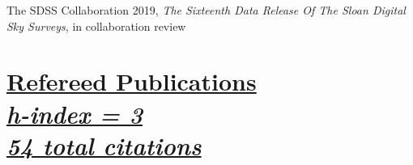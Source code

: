 \documentclass[margin]{res}
\begin{document}
\begin{resume}
\vspace{-12pt}
\hangindent=15pt 
The SDSS Collaboration 2019, {\sl The Sixteenth Data Release Of The Sloan Digital Sky Surveys}, in collaboration review







\section{
\href{https://ui.adsabs.harvard.edu/search/filter_property_fq_property=AND&filter_property_fq_property=property\%3A\%22refereed\%22&fq=\%7B!type\%3Daqp\%20v\%3D\%24fq_property\%7D&fq_property=(property\%3A\%22refereed\%22)&p_=0&q=orcid\%3A0000-0002-1873-8973&sort=citation_count\%20desc\%2C\%20bibcode\%20desc}
{Refereed Publications\\  
\normalfont \textit{\small{h-index = 3\\
54 total citations}}}
}





\end{resume}
\end{document}
